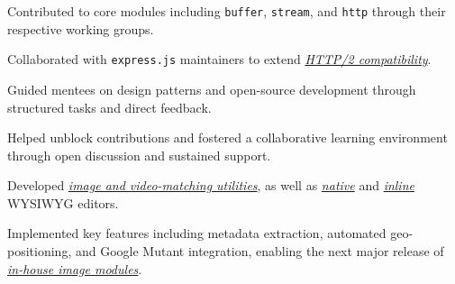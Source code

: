\documentclass[]{rexagod-resume-openfont}
\begin{document}
\begin{minipage}[t]{0.66\textwidth}
\begin{tightemize}
\item Contributed to core modules including \texttt{buffer}, \texttt{stream}, and \texttt{http} through their respective working groups.
\item Collaborated with \texttt{express.js} maintainers to extend \href{\expressHttpTwoCompatibilityUrl}{\emph{HTTP/2 compatibility}}.
\end{tightemize}
\sectionsep

\begin{tightemize}
\item Guided mentees on design patterns and open-source development through structured tasks and direct feedback.
\item Helped unblock contributions and fostered a collaborative learning environment through open discussion and sustained support.
\end{tightemize}
\sectionsep

\begin{tightemize}
\item Developed \href{\matcherUrl}{\emph{image and video-matching utilities}}, as well as \href{\publicLabEditorNativeUrl}{\emph{native}} and \href{\publicLabInlineEditorUrl}{\emph{inline}} WYSIWYG editors.
\item Implemented key features including metadata extraction, automated geo-positioning, and Google Mutant integration, enabling the next major release of \href{\leafletDistortableImageUrl}{\emph{in-house image modules}}.
\end{tightemize}
\sectionsep


\end{minipage} 
\end{document}
